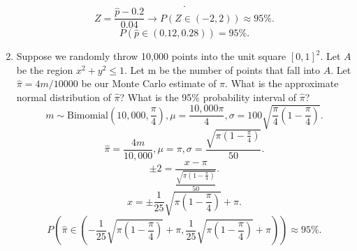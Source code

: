 \documentclass{article}
\begin{document}
\begin{enumerate}
\[            .\] 
            \[
                Z = \frac{\hat{p} - 0.2}{0.04} \rightarrow P(Z \in (-2, 2)) \approx 95\%
            .\] 
            \[
                P(\hat{p} \in (0.12, 0.28)) = 95\%
            .\] 
        \item Suppose we randomly throw 10,000 points into the unit square $[0, 1]^2$. Let $A$ be the region $x^2 + y^2 \le 1$. Let m be the number of points that fall into $A$. Let $\hat{\pi } = 4m/10000$ be our Monte Carlo estimate of $\pi $. What is the approximate normal distribution of $\hat{\pi }$? What is the 95\% probability interval of $\hat{\pi }$?
            \[
                m \sim \text{Bimomial}(10,000,\frac{\pi}{4}), \mu = \frac{10,000\pi }{4}, \sigma = 100\sqrt{\frac{\pi }{4}(1-\frac{\pi }{4})}
            .\] 
            \[
                \hat{\pi } = \frac{4m}{10,000}, \mu = \pi , \sigma = \frac{\sqrt{\pi (1-\frac{\pi }{4})}}{50}
            .\] 
            \[
                \pm 2=\frac{x-\pi }{\frac{\sqrt{\pi (1-\frac{\pi }{4})}}{50}}
            .\] 
            \[
                x = \pm \frac{1}{25}\sqrt{\pi (1-\frac{\pi }{4})} + \pi 
            .\] 
            \[
                P(\hat{\pi } \in (-\frac{1}{25}\sqrt{\pi (1-\frac{\pi }{4})} + \pi, \frac{1}{25}\sqrt{\pi (1-\frac{\pi }{4})} + \pi)) \approx 95\%
            .\] 
    \end{enumerate}
\end{document}
